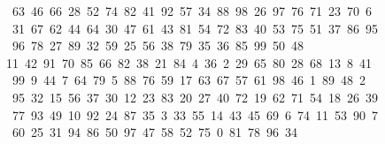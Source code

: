 \begin{tabbing}
\ 63\ 46\ 66\ 28\ 52\ 74\ 82\ 41\ 92\ 57\ 34\ 88\ 98\ 26\ 97\ 76\ 71\ 23\ 70\ 6\\[0pt]
\ 31\ 67\ 62\ 44\ 64\ 30\ 47\ 61\ 43\ 81\ 54\ 72\ 83\ 40\ 53\ 75\ 51\ 37\ 86\ 95\\[0pt]
\>\ 96\ 78\ 27\ 89\ 32\ 59\ 25\ 56\ 38\ 79\ 35\ 36\ 85\ 99\ 50\ 48\\[0pt]
11\ 42\ 91\ 70\ 85\ 66\ 82\ 38\ 21\ 84\ 4\ 36\ 2\ 29\ 65\ 80\ 28\ 68\ 13\ 8\ 41\ \\[0pt]
\ 99\ 9\ 44\ 7\ 64\ 79\ 5\ 88\ 76\ 59\ 17\ 63\ 67\ 57\ 61\ 98\ 46\ 1\ 89\ 48\ 2\\[0pt]
\ 95\ 32\ 15\ 56\ 37\ 30\ 12\ 23\ 83\ 20\ 27\ 40\ 72\ 19\ 62\ 71\ 54\ 18\ 26\ 39\\[0pt]
\>\ 77\ 93\ 49\ 10\ 92\ 24\ 87\ 35\ 3\ 33\ 55\ 14\ 43\ 45\ 69\ 6\ 74\ 11\ 53\ 90\ 7\\[0pt]
\ 60\ 25\ 31\ 94\ 86\ 50\ 97\ 47\ 58\ 52\ 75\ 0\ 81\ 78\ 96\ 34\\[0pt]

\end{tabbing}
